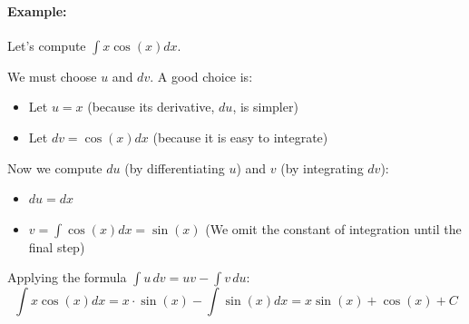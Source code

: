 \paragraph*{Example:}
Let's compute $\int x \cos(x) dx$.

We must choose $u$ and $dv$. A good choice is:
\begin{itemize}
    \item Let $u = x$ (because its derivative, $du$, is simpler)
    \item Let $dv = \cos(x) dx$ (because it is easy to integrate)
\end{itemize}
Now we compute $du$ (by differentiating $u$) and $v$ (by integrating $dv$):
\begin{itemize}
    \item $du = dx$
    \item $v = \int \cos(x) dx = \sin(x)$ (We omit the constant of integration until the final step)
\end{itemize}
Applying the formula $\int u \, dv = uv - \int v \, du$:
\[
\int x \cos(x) dx = x \cdot \sin(x) - \int \sin(x) dx = x\sin(x) + \cos(x) + C
\]

